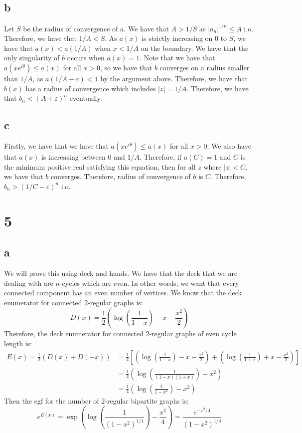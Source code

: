\documentclass[]{article}
\begin{document}
\subsection{b}
Let $S$ be the radius of convergence of $a$. We have that $A > 1/S$ as $|a_n|^{1/n} \leq A$ i.o. Therefore, we have that $1/A < S$. As $a(x)$ is strictly increasing on $0$ to $S$, we have that $a(x) < a(1/A)$ when $x < 1/A$ on the boundary. We have that the only singularity of $b$ occurs when $a(x) = 1$. Note that we have that $a(x e^{i\theta}) \leq a(x)$ for all $x> 0$, so we have that $b$ converges on a radius smaller than $1/A$, as $a(1/A - \varepsilon) < 1$ by the argument above. Therefore, we have that $b(x)$ has a radius of convergence which includes $|z| = 1/A$. Therefore, we have that $b_n < \left(A + \varepsilon \right)^n$ eventually. 

\subsection{c}
Firstly, we have that we have that $a(x e^{i\theta}) \leq a(x)$ for all $x > 0$. We also have that $a(x)$ is increasing between $0$ and $1/A$. Therefore, if $a(C) = 1$ and $C$ is the minimum positive real satisfying this equation, then for all $z$ where $|z| < C$, we have that $b$ converges. Therefore, radius of convergence of $b$ is $C$. Therefore, $b_n > \left(1/C - \varepsilon \right)^n$ i.o. 

\section{5}

\subsection{a}
We will prove this using deck and hands.
We have that the deck that we are dealing with are $n$-cycles which are even. In other words, we want that every connected component has an even number of vertices. We know that the deck enumerator for connected $2$-regular graphs is:
\begin{equation}
	D(x) = \frac{1}{2}\left(\log\left(\frac{1}{1 - x}\right) - x - \frac{x^2}{2}\right)
\end{equation}
Therefore, the deck enumerator for connected $2$-regular graphs of even cycle length is:
\begin{align}
	E(x) = \frac{1}{2} \left(D(x) + D(-x)\right) &= \frac{1}{4} \left[ \left(\log\left(\frac{1}{1 - x}\right) - x - \frac{x^2}{2}\right) + \left(\log\left(\frac{1}{1 + x}\right) + x - \frac{x^2}{2}\right) \right]\\
	&=\frac{1}{4} \left(\log\left(\frac{1}{(1 - x)(1 + x)}\right) - x^2\right) \\
	&=\frac{1}{4} \left(\log\left(\frac{1}{1 - x^2}\right)- x^2\right) 
\end{align}
Then the egf for the number of $2$-regular bipartite graphs is:
\begin{equation}
	e^{E(x)} = \exp\left(\log\left(\frac{1}{(1 - x^2)^{1/4}}\right)- \frac{x^2}{4}\right)  = \frac{e^{-x^2/4}}{(1 - x^2)^{1/4}}
\end{equation}
\end{document}

